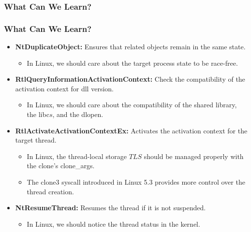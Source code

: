 \subsubsection{What Can We Learn?}
\begin{frame}
    \frametitle{What Can We Learn?}
    \begin{itemize}
        \item \textbf{NtDuplicateObject:} Ensures that related objects remain in the same state.
        \begin{itemize}
            \item In Linux, we should care about the target process state to be race-free.
        \end{itemize}
        \item \textbf{RtlQueryInformationActivationContext:} Check the compatibility of the activation context for dll version.
        \begin{itemize}
            \item In Linux, we should care about the compatibility of the shared library, the libc\(s\), and the dlopen.
        \end{itemize}
        \item \textbf{RtlActivateActivationContextEx:} Activates the activation context for the target thread.
        \begin{itemize}
            \item In Linux, the thread-local storage \(TLS\) should be managed properly with the clone's clone\_args.
            \item The clone3 syscall introduced in Linux 5.3 provides more control over the thread creation.
        \end{itemize}
        \item \textbf{NtResumeThread:} Resumes the thread if it is not suspended.
        \begin{itemize}
            \item In Linux, we should notice the thread status in the kernel.
        \end{itemize}
    \end{itemize}
\end{frame}

